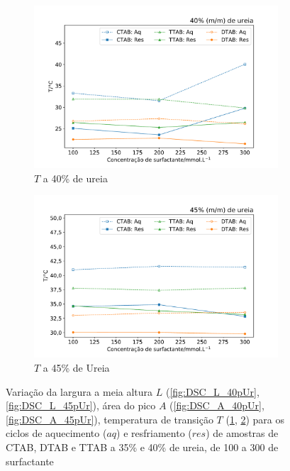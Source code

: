 \begin{figure}[H]
	 	\begin{subfigure}[t]{0.45\textwidth}
	 		\includegraphics[width=\textwidth]{./imagens/dsc/T_40p_1_300_aq_res}
	 		\caption{$T$ a 40\% de ureia}
	 		\label{fig:DSC_T_40pUr}
	 	\end{subfigure} \qquad %
	 	\begin{subfigure}[t]{0.45\textwidth}
	 		\includegraphics[width=\textwidth]{./imagens/dsc/T_45p_1_300_aq_res}
	 		\caption{$T$ a 45\% de Ureia}
	 		\label{fig:DSC_T_45pUr}
	 	\end{subfigure}
 	
	 	\caption{Variação da largura a meia altura $L$ (\ref{fig:DSC_L_40pUr}, \ref{fig:DSC_L_45pUr}), área do pico $A$ (\ref{fig:DSC_A_40pUr}, \ref{fig:DSC_A_45pUr}), temperatura de transição $T$ (\ref{fig:DSC_T_40pUr}, \ref{fig:DSC_T_45pUr}) para os ciclos de aquecimento ($aq$) e resfriamento ($res$) de amostras de CTAB, DTAB e TTAB a 35\% e 40\% de ureia, de 100 a 300 \mM{} de surfactante}
	 	\label{fig:DSC_propriedades_surf_40_45}
	 \end{figure}
	
